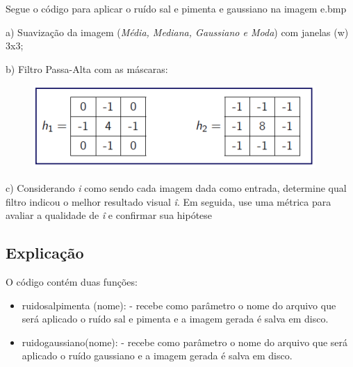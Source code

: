 \documentclass[10pt,a4paper]{article}
\begin{document}
\begin{flushleft}
Segue o código para aplicar o ruído sal e pimenta e gaussiano na imagem e.bmp
\end{flushleft}



\begin{flushleft}
a) Suavização da imagem (\textit {Média, Mediana, Gaussiano e Moda}) com janelas (w) 3x3;
\end{flushleft}



\begin{flushleft}
b) Filtro Passa-Alta com as máscaras:
\end{flushleft}

\begin{figure}[H]
    \centering
    \includegraphics{images_original/08/Filtragem - matriz.png}
\end{figure}



\begin{flushleft}
c) Considerando \textit{i} como sendo cada imagem dada como entrada, determine qual filtro indicou o melhor resultado visual \textit{î}. Em seguida, use uma métrica para avaliar a qualidade de \textit{î} e confirmar sua hipótese
\end{flushleft}



\subsection{Explicação}

\begin{flushleft}
O código contém duas funções:
\end{flushleft}

\begin{itemize}
    \item {\ttfamily ruido\textunderscore sal\textunderscore pimenta (nome):} - recebe como parâmetro o nome do arquivo que será aplicado o ruído sal e pimenta e a imagem gerada é salva em disco.
    \item {\ttfamily ruido\textunderscore gaussiano(nome):}  - recebe como parâmetro o nome do arquivo que será aplicado o ruído gaussiano e a imagem gerada é salva em disco.
\end{itemize}
\end{document}
